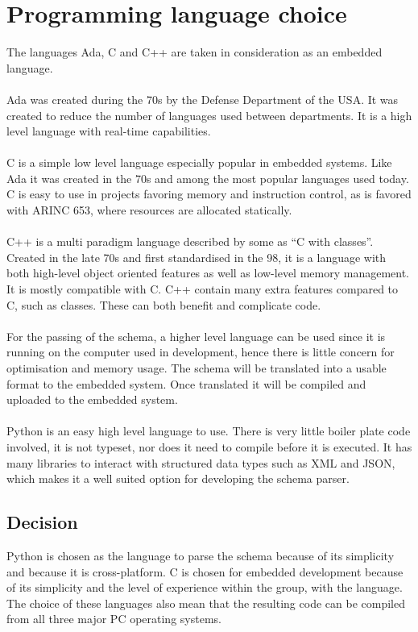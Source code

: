 \section{Programming language choice}
The languages Ada, C and C++ are taken in consideration as an embedded language.
\\\\
Ada was created during the 70\textquotesingle{}s by the Defense Department of the USA.
It was created to reduce the number of
languages used between departments.
It is a high level language with real-time capabilities.
\\\\
C is a simple low level language especially popular in embedded systems.
Like Ada it was created in the 70\textquotesingle{}s and
among the most popular languages used today.
C is easy to use in projects favoring memory and instruction control,
as is favored with ARINC 653,
where resources are allocated statically.
\\\\
C++ is a multi paradigm language described by some as ``C with classes''.
Created in the late 70\textquotesingle{}s and first standardised in the 98, it
is a language with both high-level object oriented features as well as low-level
memory management. It is mostly compatible with C. C++ contain many extra
features compared to C, such as classes. These can both benefit and complicate
code.
\\\\
For the passing of the schema, a higher level language can be used
since it is running on the computer used in development,
hence there is little concern for optimisation and memory usage.
The schema will be translated into a usable format to the embedded system.
Once translated it will be compiled and uploaded to the
embedded system.
\\\\
Python is an easy high level language to use.
There is very little boiler plate code involved,
it is not typeset, nor does it need to compile
before it is executed.
It has many libraries to interact with structured
data types such as XML and JSON,
which makes it a well suited option for developing the schema parser.

\subsection{Decision}
Python is chosen as the language to parse the schema because of its simplicity
and because it is cross-platform.
C is chosen for embedded development because of its simplicity and
the level of experience within the group, with the language.\\
The choice of these languages also mean that the resulting code can be compiled
from all three major PC operating systems.
